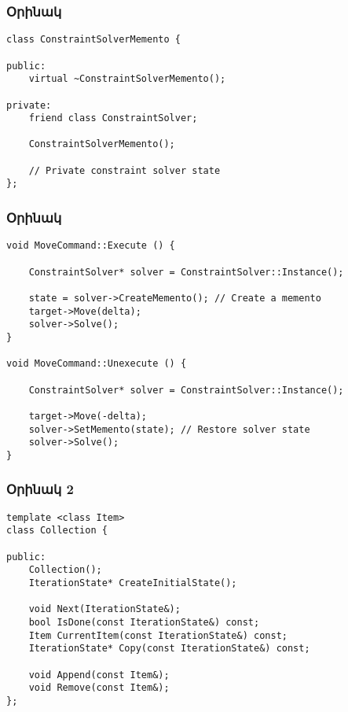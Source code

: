 \documentclass{beamer}
\begin{document}
\begin{frame}[fragile]\frametitle{Օրինակ}
\begin{english}
\begin{verbatim}
class ConstraintSolverMemento {

public:
    virtual ~ConstraintSolverMemento();

private:
    friend class ConstraintSolver;

    ConstraintSolverMemento();

    // Private constraint solver state
};
\end{verbatim}
\end{english}
\end{frame}

\begin{frame}[fragile]\frametitle{Օրինակ}
\begin{english}
\begin{verbatim}
void MoveCommand::Execute () {

    ConstraintSolver* solver = ConstraintSolver::Instance();

    state = solver->CreateMemento(); // Create a memento
    target->Move(delta);
    solver->Solve();
}

void MoveCommand::Unexecute () {

    ConstraintSolver* solver = ConstraintSolver::Instance();

    target->Move(-delta);
    solver->SetMemento(state); // Restore solver state
    solver->Solve();
}
\end{verbatim}
\end{english}
\end{frame}

\begin{frame}[fragile]\frametitle{Օրինակ 2}
\begin{english}
\begin{verbatim}
template <class Item>
class Collection {

public:
    Collection();
    IterationState* CreateInitialState();

    void Next(IterationState&);
    bool IsDone(const IterationState&) const;
    Item CurrentItem(const IterationState&) const;
    IterationState* Copy(const IterationState&) const;

    void Append(const Item&);
    void Remove(const Item&);
};
\end{verbatim}
\end{english}
\end{frame}
\end{document}
